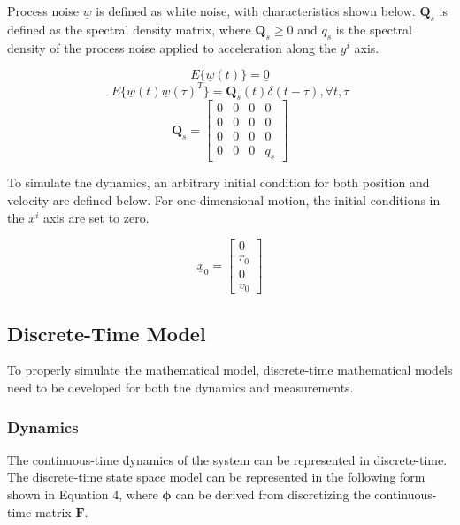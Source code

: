 \documentclass{article}
\begin{document}
Process noise $\underline{w}$ is defined as white noise, with characteristics shown below. $\mathbf{Q}_s$ is defined as the spectral density matrix, where $\mathbf{Q}_s \geq 0$ and $q_s$ is the spectral density of the process noise applied to acceleration along the \textbf{$y^i$} axis.

\begin{equation*}
    E\{\underline{w}(t)\} = \underline{0}
\end{equation*}
\begin{equation*}
    E\{\underline{w}(t)\underline{w}(\tau)^T\} = \mathbf{Q}_s(t)\delta(t-\tau), \forall t,\tau
\end{equation*}
\begin{equation*}
    \mathbf{Q}_s = 
    \begin{bmatrix} 0 & 0 & 0 & 0 \\ 0 & 0 & 0 & 0 \\ 0 & 0 & 0 & 0 \\ 0 & 0 & 0 & q_s \end{bmatrix}
\end{equation*}

To simulate the dynamics, an arbitrary initial condition for both position and velocity are defined below. For one-dimensional motion, the initial conditions in the \textbf{$x^i$} axis are set to zero.

\begin{equation*}
    \underline{x}_0
    = 
    \begin{bmatrix}
        0 \\ r_0 \\ 0 \\ v_0
    \end{bmatrix}
\end{equation*}

\subsection{Discrete-Time Model}
To properly simulate the mathematical model, discrete-time mathematical models need to be developed for both the dynamics and measurements.

\subsubsection{Dynamics}
 The continuous-time dynamics of the system can be represented in discrete-time. The discrete-time state space model can be represented in the following form shown in Equation 4, where $\boldsymbol{\phi}$ can be derived from discretizing the continuous-time matrix $\mathbf{F}$.
\end{document}
